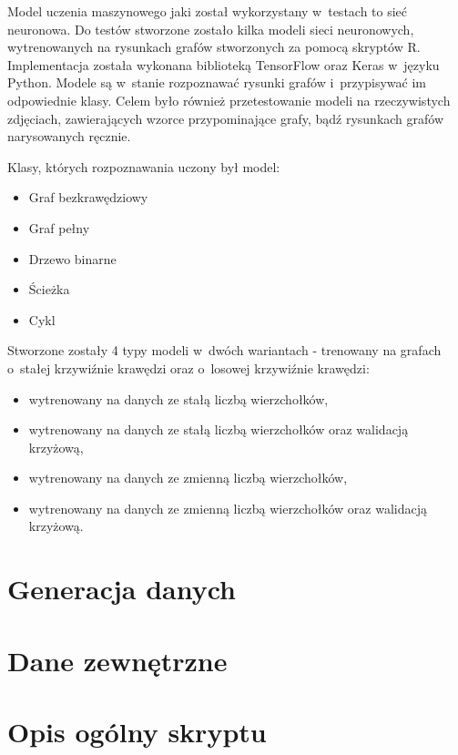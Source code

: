 Model uczenia maszynowego jaki został wykorzystany w~testach to sieć neuronowa.
Do testów stworzone zostało kilka modeli sieci neuronowych,
wytrenowanych na rysunkach grafów stworzonych za pomocą skryptów R.
Implementacja została wykonana biblioteką TensorFlow oraz Keras w~języku Python.
Modele są w~stanie rozpoznawać rysunki grafów i~przypisywać im odpowiednie klasy.
Celem było również przetestowanie modeli na rzeczywistych zdjęciach,
zawierających wzorce przypominające grafy, bądź rysunkach grafów narysowanych ręcznie.

Klasy, których rozpoznawania uczony był model:
\begin{itemize}[label=-,labelsep=0.4cm,leftmargin=0.6cm]
	\item Graf bezkrawędziowy
	\item Graf pełny
	\item Drzewo binarne
	\item Ścieżka
	\item Cykl
\end{itemize}

Stworzone zostały 4 typy modeli w~dwóch wariantach - trenowany na grafach o~stałej krzywiźnie krawędzi oraz o~losowej krzywiźnie krawędzi:
\begin{itemize}[label=-,labelsep=0.4cm,leftmargin=0.6cm]
	\item wytrenowany na danych ze stałą liczbą wierzchołków,
	\item wytrenowany na danych ze stałą liczbą wierzchołków oraz walidacją krzyżową,
	\item wytrenowany na danych ze zmienną liczbą wierzchołków,
	\item wytrenowany na danych ze zmienną liczbą wierzchołków oraz walidacją krzyżową.
\end{itemize}

\section{Generacja danych}


\section{Dane zewnętrzne}


\section{Opis ogólny skryptu}
